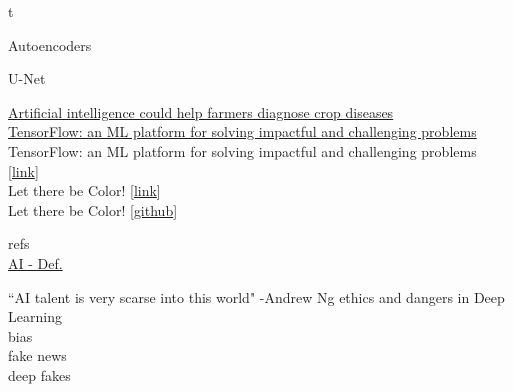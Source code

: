 \documentclass[10pt, compress]{beamer}
\begin{document}
\begin{frame}
  t  \\
\end{frame}

\begin{frame}
  Autoencoders
\end{frame}

\begin{frame}
  U-Net
\end{frame}

\begin{frame}
\href{https://news.psu.edu/story/429727/2016/10/04/research/artificial-intelligence-could-help-farmers-diagnose-crop-diseases}{Artificial intelligence could help farmers diagnose crop diseases} \\
%
\href{https://www.youtube.com/watch?v=NlpS-DhayQA}{TensorFlow: an ML platform for solving impactful and challenging problems} \\

TensorFlow: an ML platform for solving impactful and challenging problems [\href{https://www.youtube.com/watch?v=NlpS-DhayQA}{link}] \\

Let there be Color! [\href{http://iizuka.cs.tsukuba.ac.jp/projects/colorization/extra.html}{link}] \\

Let there be Color! [\href{https://github.com/satoshiiizuka/siggraph2016_colorization}{github}]

refs \\
\href{https://www.sciencedaily.com/terms/artificial_intelligence.htm}{AI - Def.}
\end{frame}

\begin{frame}
  \vspace{1cm}
  ``AI talent is very scarse into this world" -Andrew Ng
  ethics and dangers in Deep Learning \\
  bias \\
  fake news \\
  deep fakes
\end{frame}
\end{document}
